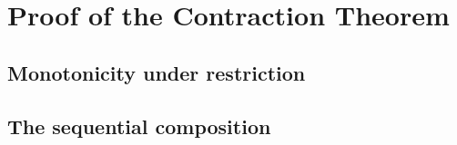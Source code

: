 
\section{Proof of the Contraction Theorem}
\label{p2:apx:contraction}

\subsection{Monotonicity under restriction}
\label{p2:sub:apx_monotonicity}

\subsection{The sequential composition}
\label{p2:sub:apx_sequential_composition}

